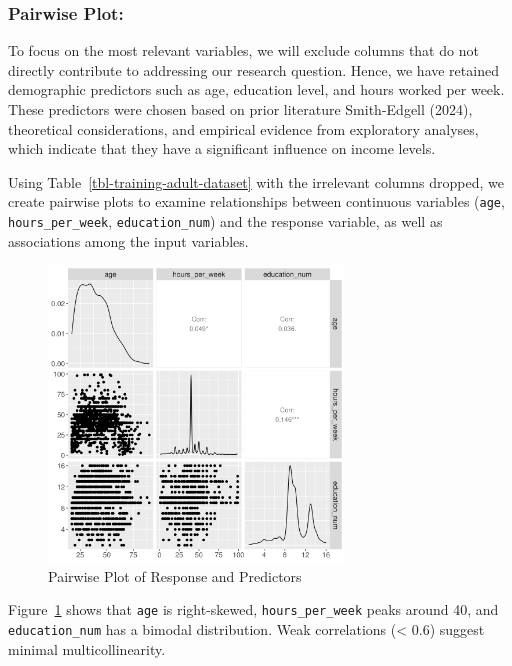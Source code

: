 \documentclass[
  letterpaper,
  DIV=11,
  numbers=noendperiod]{scrartcl}
\begin{document}
\hypertarget{pairwise-plot}{%
\subsubsection{Pairwise Plot:}\label{pairwise-plot}}

To focus on the most relevant variables, we will exclude columns that do
not directly contribute to addressing our research question. Hence, we
have retained demographic predictors such as age, education level, and
hours worked per week. These predictors were chosen based on prior
literature Smith-Edgell (2024), theoretical considerations, and
empirical evidence from exploratory analyses, which indicate that they
have a significant influence on income levels.

Using Table~\ref{tbl-training-adult-dataset} with the irrelevant columns
dropped, we create pairwise plots to examine relationships between
continuous variables (\texttt{age}, \texttt{hours\_per\_week},
\texttt{education\_num}) and the response variable, as well as
associations among the input variables.

\begin{figure}

{\centering \includegraphics[width=0.7\textwidth,height=0.7\textheight]{../results/eda/pairwise_plot.png}

}

\caption{\label{fig-pairwise-plot}Pairwise Plot of Response and
Predictors}

\end{figure}

Figure~\ref{fig-pairwise-plot} shows that \texttt{age} is right-skewed,
\texttt{hours\_per\_week} peaks around 40, and \texttt{education\_num}
has a bimodal distribution. Weak correlations (\textless{} 0.6) suggest
minimal multicollinearity.
\end{document}
